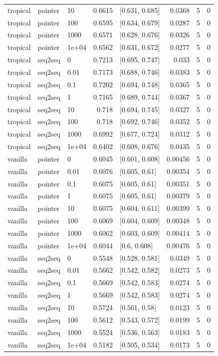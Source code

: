 \documentclass[10pt]{article}
\begin{document}
{\begin{longtable}{lllrlrrr}
tropical & pointer & 10 & 0.6615 & [0.631, 0.685] & 0.0368 & 5 & 0\\
tropical & pointer & 100 & 0.6595 & [0.634, 0.679] & 0.0287 & 5 & 0\\
tropical & pointer & 1000 & 0.6571 & [0.628, 0.676] & 0.0326 & 5 & 0\\
tropical & pointer & 1e+04 & 0.6562 & [0.631, 0.672] & 0.0277 & 5 & 0\\
tropical & seq2seq & 0 & 0.7213 & [0.695, 0.747] & 0.033 & 5 & 0\\
tropical & seq2seq & 0.01 & 0.7173 & [0.688, 0.746] & 0.0383 & 5 & 0\\
tropical & seq2seq & 0.1 & 0.7202 & [0.694, 0.748] & 0.0365 & 5 & 0\\
tropical & seq2seq & 1 & 0.7165 & [0.689, 0.744] & 0.0367 & 5 & 0\\
tropical & seq2seq & 10 & 0.718 & [0.694, 0.745] & 0.0327 & 5 & 0\\
tropical & seq2seq & 100 & 0.718 & [0.692, 0.746] & 0.0352 & 5 & 0\\
tropical & seq2seq & 1000 & 0.6992 & [0.677, 0.724] & 0.0312 & 5 & 0\\
tropical & seq2seq & 1e+04 & 0.6402 & [0.608, 0.676] & 0.0435 & 5 & 0\\
vanilla & pointer & 0 & 0.6045 & [0.601, 0.608] & 0.00456 & 5 & 0\\
vanilla & pointer & 0.01 & 0.6076 & [0.605, 0.61] & 0.00354 & 5 & 0\\
vanilla & pointer & 0.1 & 0.6075 & [0.605, 0.61] & 0.00351 & 5 & 0\\
vanilla & pointer & 1 & 0.6075 & [0.605, 0.61] & 0.00379 & 5 & 0\\
vanilla & pointer & 10 & 0.6075 & [0.604, 0.611] & 0.00399 & 5 & 0\\
vanilla & pointer & 100 & 0.6069 & [0.604, 0.609] & 0.00348 & 5 & 0\\
vanilla & pointer & 1000 & 0.6062 & [0.603, 0.609] & 0.00414 & 5 & 0\\
vanilla & pointer & 1e+04 & 0.6044 & [0.6, 0.608] & 0.00476 & 5 & 0\\
vanilla & seq2seq & 0 & 0.5548 & [0.528, 0.581] & 0.0349 & 5 & 0\\
vanilla & seq2seq & 0.01 & 0.5662 & [0.542, 0.582] & 0.0273 & 5 & 0\\
vanilla & seq2seq & 0.1 & 0.5669 & [0.542, 0.583] & 0.0274 & 5 & 0\\
vanilla & seq2seq & 1 & 0.5669 & [0.542, 0.583] & 0.0274 & 5 & 0\\
vanilla & seq2seq & 10 & 0.5724 & [0.561, 0.58] & 0.0123 & 5 & 0\\
vanilla & seq2seq & 100 & 0.5612 & [0.543, 0.572] & 0.0199 & 5 & 0\\
vanilla & seq2seq & 1000 & 0.5524 & [0.536, 0.563] & 0.0183 & 5 & 0\\
vanilla & seq2seq & 1e+04 & 0.5182 & [0.505, 0.534] & 0.0173 & 5 & 0\\
\bottomrule
\end{longtable}
}
\end{document}
